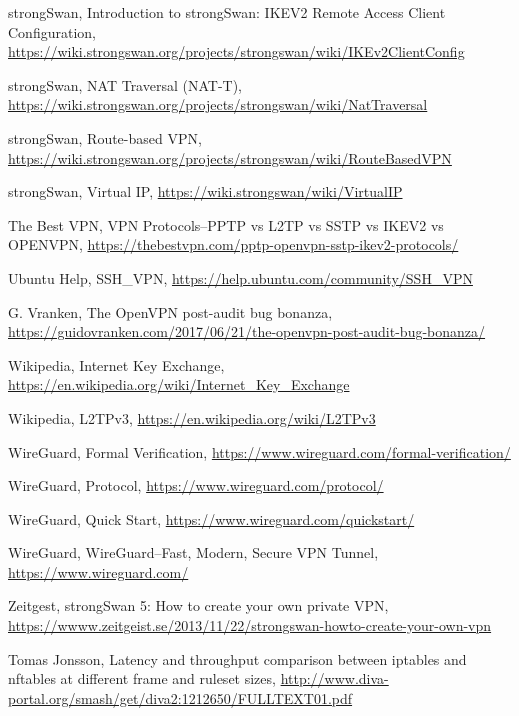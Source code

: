 \begin{thebibliography}{10}
  strongSwan, Introduction to strongSwan: IKEV2 Remote Access Client Configuration,
  \url{https://wiki.strongswan.org/projects/strongswan/wiki/IKEv2ClientConfig}

  strongSwan, NAT Traversal (NAT-T),
  \url{https://wiki.strongswan.org/projects/strongswan/wiki/NatTraversal}

  strongSwan, Route-based VPN,
  \url{https://wiki.strongswan.org/projects/strongswan/wiki/RouteBasedVPN}

  strongSwan, Virtual IP,
  \url{https://wiki.strongswan/wiki/VirtualIP}

  The Best VPN, VPN Protocols--PPTP vs L2TP vs SSTP vs IKEV2 vs OPENVPN,
  \url{https://thebestvpn.com/pptp-openvpn-sstp-ikev2-protocols/}

  Ubuntu Help, SSH\_VPN,
  \url{https://help.ubuntu.com/community/SSH_VPN}

  G. Vranken, The OpenVPN post-audit bug bonanza,
  \url{https://guidovranken.com/2017/06/21/the-openvpn-post-audit-bug-bonanza/}

  Wikipedia, Internet Key Exchange,
  \url{https://en.wikipedia.org/wiki/Internet_Key_Exchange}

  Wikipedia, L2TPv3,
  \url{https://en.wikipedia.org/wiki/L2TPv3}

  WireGuard, Formal Verification,
  \url{https://www.wireguard.com/formal-verification/}

  WireGuard, Protocol,
  \url{https://www.wireguard.com/protocol/}

  WireGuard, Quick Start,
  \url{https://www.wireguard.com/quickstart/}

  WireGuard, WireGuard--Fast, Modern, Secure VPN Tunnel,
  \url{https://www.wireguard.com/}

  Zeitgest, strongSwan 5: How to create your own private VPN,
  \url{https://wwww.zeitgeist.se/2013/11/22/strongswan-howto-create-your-own-vpn}

  Tomas Jonsson, Latency and throughput comparison between iptables and nftables
  at different frame and ruleset sizes,
  \url{http://www.diva-portal.org/smash/get/diva2:1212650/FULLTEXT01.pdf}


\end{thebibliography}
